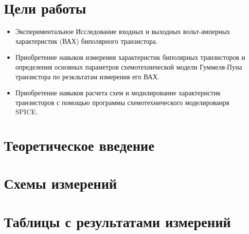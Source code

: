 \documentclass[a4paper,14pt]{article}
\begin{document}

\tableofcontents
\pagebreak
\section{Цели работы}
\begin{itemize}
	\item Экспериментальное Исследование входных и выходных вольт-амперных характеристик (ВАХ) биполярного транзистора.
	
	\item Приобретение навыков измерения характеристик биполярных транзисторов и  определения основных параметров схемотехнической модели Гуммеля-Пуна транзистора по резкльтатам измерения его ВАХ.
	
	\item Приобретение навыков расчета схем и моднлирование характеристик транзисторов с помощью программы схемотехнического моделированря SPICE.
\end{itemize}

\section{Теоретическое введение}

\section{Схемы измерений}

\section{Таблицы с результатами измерений}
\end{document}
